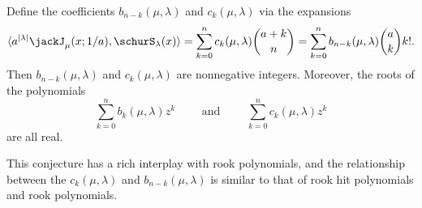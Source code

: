 \begin{conjecture}
Define the coefficients $b_{n-k}(\mu,\lambda)$ and $c_k(\mu,\lambda)$ via
the expansions
\begin{equation*}
\langle a^{|\lambda|}\jackJ_\mu(x;1/a) , \schurS_\lambda(x) \rangle
=
\sum_{k=0}^{n} c_k(\mu,\lambda) \binom{a+k}{n}
=
\sum_{k=0}^{n} b_{n-k}(\mu,\lambda) \binom{a}{k} k!.
\end{equation*}
Then $b_{n-k}(\mu,\lambda)$ and $c_k(\mu,\lambda)$ are nonnegative integers.
Moreover, the roots of the polynomials
\[
\sum_{k=0}^{n} b_k(\mu,\lambda) z^k
\qquad \text{ and } \qquad
\sum_{k=0}^{n} c_k(\mu,\lambda) z^k
\]
are all real.
\end{conjecture}
This conjecture has a rich interplay with rook polynomials, and the
relationship between the $c_k(\mu,\lambda)$ and $b_{n-k}(\mu,\lambda)$ is
similar to that of rook hit polynomials and rook polynomials.


